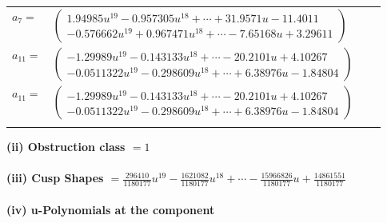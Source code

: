 \documentclass[1p]{elsarticle_modified}
\theoremstyle{definition}
\begin{document}
\begin{tabular}{m{7pt} m{180pt} m{7pt} m{180pt} }
\flushright $a_{7}=$&$\begin{pmatrix}1.94985 u^{19}-0.957305 u^{18}+\cdots+31.9571 u-11.4011\\-0.576662 u^{19}+0.967471 u^{18}+\cdots-7.65168 u+3.29611\end{pmatrix}$ \\
\flushright $a_{11}=$&$\begin{pmatrix}-1.29989 u^{19}-0.143133 u^{18}+\cdots-20.2101 u+4.10267\\-0.0511322 u^{19}-0.298609 u^{18}+\cdots+6.38976 u-1.84804\end{pmatrix}$\\ \flushright $a_{11}=$&$\begin{pmatrix}-1.29989 u^{19}-0.143133 u^{18}+\cdots-20.2101 u+4.10267\\-0.0511322 u^{19}-0.298609 u^{18}+\cdots+6.38976 u-1.84804\end{pmatrix}$\\&\end{tabular}
\flushleft \textbf{(ii) Obstruction class $= 1$}\\~\\
\flushleft \textbf{(iii) Cusp Shapes $= \frac{296410}{1180177} u^{19}-\frac{1621082}{1180177} u^{18}+\cdots-\frac{15966826}{1180177} u+\frac{14861551}{1180177}$}\\~\\
\newpage\renewcommand{\arraystretch}{1}
\flushleft \textbf{(iv) u-Polynomials at the component}\newline \\
\end{document}
